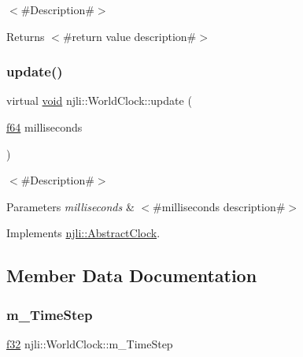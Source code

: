 $<$\#\+Description\#$>$

\begin{DoxyReturn}{Returns}
$<$\#return value description\#$>$ 
\end{DoxyReturn}
\mbox{\label{classnjli_1_1_world_clock_ae68c432422e175aaa52746b99c57f843}} 
\subsubsection{\texorpdfstring{update()}{update()}}
{\footnotesize\ttfamily virtual \mbox{\hyperlink{_thread_8h_af1e856da2e658414cb2456cb6f7ebc66}{void}} njli\+::\+World\+Clock\+::update (\begin{DoxyParamCaption}\item[{\mbox{\hyperlink{_util_8h_a94dab5770726ccbef8c7d026cfbdf8e5}{f64}}}]{milliseconds }\end{DoxyParamCaption})\hspace{0.3cm}{\ttfamily [virtual]}}

$<$\#\+Description\#$>$


\begin{DoxyParams}{Parameters}
{\em milliseconds} & $<$\#milliseconds description\#$>$ \\
\hline
\end{DoxyParams}


Implements \mbox{\hyperlink{classnjli_1_1_abstract_clock_a06401048780f7b9522187731d3a97579}{njli\+::\+Abstract\+Clock}}.



\subsection{Member Data Documentation}
\mbox{\label{classnjli_1_1_world_clock_aa727682fd2ee70cbfba4e78813e8f730}} 
\subsubsection{\texorpdfstring{m\+\_\+\+Time\+Step}{m\_TimeStep}}
{\footnotesize\ttfamily \mbox{\hyperlink{_util_8h_a5f6906312a689f27d70e9d086649d3fd}{f32}} njli\+::\+World\+Clock\+::m\+\_\+\+Time\+Step\hspace{0.3cm}{\ttfamily [private]}}



